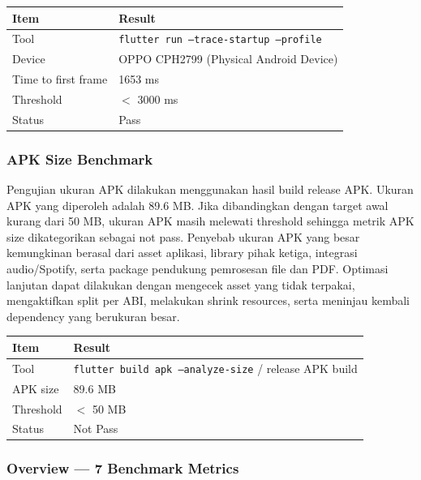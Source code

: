 \documentclass[11pt]{article}
\begin{document}
\begin{center}
\renewcommand{\arraystretch}{1.2}
\begin{tabular}{|p{}|p{}|}
\hline
\textbf{Item} & \textbf{Result} \\
\hline
Tool & \texttt{flutter run --trace-startup --profile} \\
\hline
Device & OPPO CPH2799 (Physical Android Device) \\
\hline
Time to first frame & 1653 ms \\
\hline
Threshold & $<$ 3000 ms \\
\hline
Status & Pass \\
\hline
\end{tabular}
\end{center}

\subsubsection{APK Size Benchmark}

Pengujian ukuran APK dilakukan menggunakan hasil build release APK. Ukuran APK yang diperoleh adalah 89.6 MB. Jika dibandingkan dengan target awal kurang dari 50 MB, ukuran APK masih melewati threshold sehingga metrik APK size dikategorikan sebagai not pass. Penyebab ukuran APK yang besar kemungkinan berasal dari asset aplikasi, library pihak ketiga, integrasi audio/Spotify, serta package pendukung pemrosesan file dan PDF. Optimasi lanjutan dapat dilakukan dengan mengecek asset yang tidak terpakai, mengaktifkan split per ABI, melakukan shrink resources, serta meninjau kembali dependency yang berukuran besar.

\begin{center}
\renewcommand{\arraystretch}{1.2}
\begin{tabular}{|p{}|p{}|}
\hline
\textbf{Item} & \textbf{Result} \\
\hline
Tool & \texttt{flutter build apk --analyze-size} / release APK build \\
\hline
APK size & 89.6 MB \\
\hline
Threshold & $<$ 50 MB \\
\hline
Status & Not Pass \\
\hline
\end{tabular}
\end{center}

\subsubsection{Overview --- 7 Benchmark Metrics}
\end{document}

